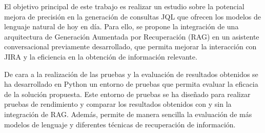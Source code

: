 El objetivo principal de este trabajo es realizar un estudio sobre la potencial mejora de precisión en la generación de consultas JQL que ofrecen los modelos de lenguaje natural de hoy en día. Para ello, se propone la integración de una arquitectura de Generación Aumentada por Recuperación (RAG) en un asistente conversacional previamente desarrollado, que permita mejorar la interacción con JIRA y la eficiencia en la obtención de información relevante.

De cara a la realización de las pruebas y la evaluación de resultados obtenidos se ha desarrollado en Python un entorno de pruebas que permita evaluar la eficacia de la solución propuesta. Este entorno de pruebas se ha diseñado para realizar pruebas de rendimiento y comparar los resultados obtenidos con y sin la integración de RAG. Además, permite de manera sencilla la evaluación de más modelos de lenguaje y diferentes técnicas de recuperación de información.

